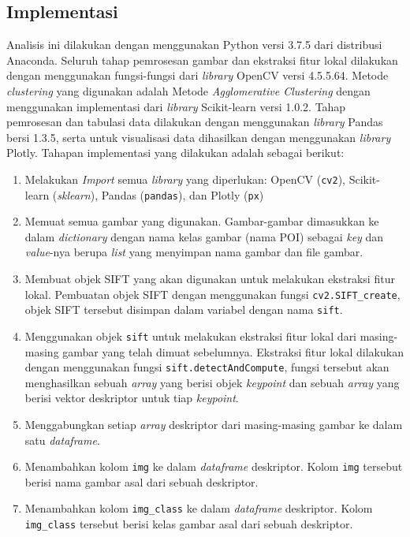 \subsection{Implementasi}
Analisis ini dilakukan dengan menggunakan Python versi 3.7.5 dari distribusi Anaconda. Seluruh tahap pemrosesan gambar dan ekstraksi fitur lokal dilakukan dengan menggunakan fungsi-fungsi dari \textit{library} OpenCV versi 4.5.5.64. Metode \textit{clustering} yang digunakan adalah Metode \textit{Agglomerative Clustering} dengan menggunakan implementasi dari \textit{library} Scikit-learn versi 1.0.2. Tahap pemrosesan dan tabulasi data dilakukan dengan menggunakan \textit{library} Pandas bersi 1.3.5, serta untuk visualisasi data dihasilkan dengan menggunakan \textit{library} Plotly. Tahapan implementasi yang dilakukan adalah sebagai berikut:
\begin{enumerate}
	\item Melakukan \textit{Import} semua \textit{library} yang diperlukan: OpenCV (\texttt{cv2}), Scikit-learn (\textit{sklearn}), Pandas (\texttt{pandas}), dan Plotly (\texttt{px})
	\item Memuat semua gambar yang digunakan. Gambar-gambar dimasukkan ke dalam \textit{dictionary} dengan nama kelas gambar (nama POI) sebagai \textit{key} dan \textit{value}-nya berupa \textit{list} yang menyimpan nama gambar dan file gambar.
	\item Membuat objek SIFT yang akan digunakan untuk melakukan ekstraksi fitur lokal. Pembuatan objek SIFT dengan menggunakan fungsi \texttt{cv2.SIFT\_create}, objek SIFT tersebut disimpan dalam variabel dengan nama \texttt{sift}.
	\item Menggunakan objek \texttt{sift} untuk melakukan ekstraksi fitur lokal dari masing-masing gambar yang telah dimuat sebelumnya. Ekstraksi fitur lokal dilakukan dengan menggunakan fungsi \texttt{sift.detectAndCompute}, fungsi tersebut akan menghasilkan sebuah \textit{array} yang berisi objek \textit{keypoint} dan sebuah \textit{array} yang berisi vektor deskriptor untuk tiap \textit{keypoint}. 
	\item Menggabungkan setiap \textit{array} deskriptor dari masing-masing gambar ke dalam satu \textit{dataframe}.
	\item Menambahkan kolom \texttt{img} ke dalam \textit{dataframe} deskriptor. Kolom \texttt{img} tersebut berisi nama gambar asal dari sebuah deskriptor.
	\item Menambahkan kolom \texttt{img\_class} ke dalam \textit{dataframe} deskriptor. Kolom \texttt{img\_class} tersebut berisi kelas gambar asal dari sebuah deskriptor.

\end{enumerate}

